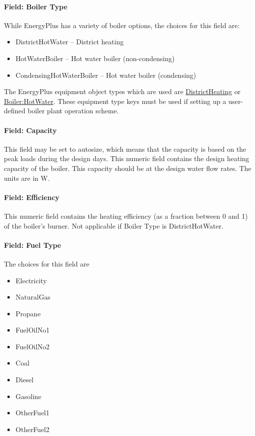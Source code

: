 \paragraph{Field: Boiler Type}\label{field-boiler-type}

While EnergyPlus has a variety of boiler options, the choices for this field are:

\begin{itemize}
\item
  DistrictHotWater -- District heating
\item
  HotWaterBoiler -- Hot water boiler (non-condensing)
\item
  CondensingHotWaterBoiler -- Hot water boiler (condensing)
\end{itemize}

The EnergyPlus equipment object types which are used are \hyperref[districtheating]{DistrictHeating} or \hyperref[boilerhotwater]{Boiler:HotWater}. These equipment type keys must be used if setting up a user-defined boiler plant operation scheme.

\paragraph{Field: Capacity}\label{field-capacity-1}

This field may be set to autosize, which means that the capacity is based on the peak loads during the design days. This numeric field contains the design heating capacity of the boiler. This capacity should be at the design water flow rates. The units are in W.

\paragraph{Field: Efficiency}\label{field-efficiency-000}

This numeric field contains the heating efficiency (as a fraction between 0 and 1) of the boiler's burner. Not applicable if Boiler Type is DistrictHotWater.

\paragraph{Field: Fuel Type}\label{field-fuel-type-1-001}

The choices for this field are

\begin{itemize}
\item
  Electricity
\item
  NaturalGas
\item
  Propane
\item
  FuelOilNo1
\item
  FuelOilNo2
\item
  Coal
\item
  Diesel
\item
  Gasoline
\item
  OtherFuel1
\item
  OtherFuel2
\end{itemize}

